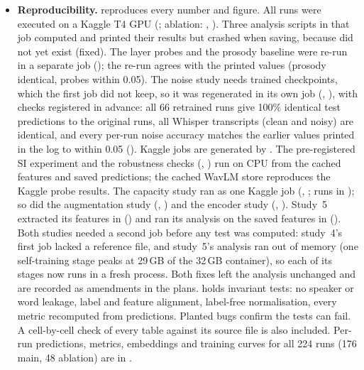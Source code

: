 \begin{itemize}
\item \textbf{Reproducibility.}  reproduces every number and figure. All runs were executed on a Kaggle T4 GPU (; ablation: , ). Three analysis scripts in that job computed and printed their results but crashed when saving, because  did not yet exist (fixed). The layer probes and the prosody baseline were re-run in a separate job (); the re-run agrees with the printed values (prosody identical, probes within 0.05\pp). The noise study needs trained checkpoints, which the first job did not keep, so it was regenerated in its own job (, ), with checks registered in advance: all 66 retrained runs give 100\% identical test predictions to the original runs, all Whisper transcripts (clean and noisy) are identical, and every per-run noise accuracy matches the earlier values printed in the log to within 0.05\pp{} (). Kaggle jobs are generated by . The pre-registered SI experiment and the robustness checks (, ) run on CPU from the cached features and saved predictions; the cached WavLM store reproduces the Kaggle probe results. The capacity study ran as one Kaggle job (, ; runs in ); so did the augmentation study (, ) and the encoder study (, ). Study~5 extracted its features in  () and ran its analysis on the saved features in  (). Both studies needed a second job before any test was computed: study~4's first job lacked a reference file, and study~5's analysis ran out of memory (one self-training stage peaks at 29\,GB of the 32\,GB container), so each of its stages now runs in a fresh process. Both fixes left the analysis unchanged and are recorded as amendments in the plans.  holds invariant tests: no speaker or word leakage, label and feature alignment, label-free normalisation, every metric recomputed from predictions. Planted bugs confirm the tests can fail. A cell-by-cell check of every table against its source file is also included. Per-run predictions, metrics, embeddings and training curves for all 224 runs (176 main, 48 ablation) are in .
\end{itemize}

